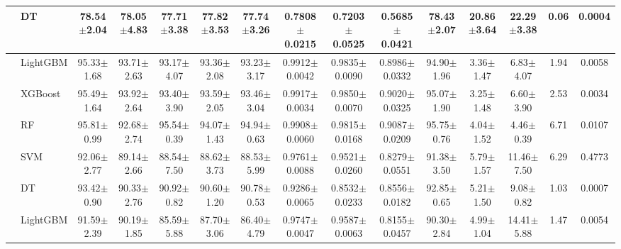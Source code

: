 \begin{tabular}{@{}llccccccccccccc@{}}
 & DT & 78.54{\tiny$\pm$2.04} & 78.05{\tiny$\pm$4.83} & 77.71{\tiny$\pm$3.38} & 77.82{\tiny$\pm$3.53} & 77.74{\tiny$\pm$3.26} & 0.7808{\tiny$\pm$0.0215} & 0.7203{\tiny$\pm$0.0525} & 0.5685{\tiny$\pm$0.0421} & 78.43{\tiny$\pm$2.07} & 20.86{\tiny$\pm$3.64} & 22.29{\tiny$\pm$3.38} & 0.06 & 0.0004\\
\midrule
{} & LightGBM & 95.33{\tiny$\pm$1.68} & 93.71{\tiny$\pm$2.63} & 93.17{\tiny$\pm$4.07} & 93.36{\tiny$\pm$2.08} & 93.23{\tiny$\pm$3.17} & 0.9912{\tiny$\pm$0.0042} & 0.9835{\tiny$\pm$0.0090} & 0.8986{\tiny$\pm$0.0332} & 94.90{\tiny$\pm$1.96} & 3.36{\tiny$\pm$1.47} & 6.83{\tiny$\pm$4.07} & 1.94 & 0.0058\\
 & XGBoost & 95.49{\tiny$\pm$1.64} & 93.92{\tiny$\pm$2.64} & 93.40{\tiny$\pm$3.90} & 93.59{\tiny$\pm$2.05} & 93.46{\tiny$\pm$3.04} & 0.9917{\tiny$\pm$0.0034} & 0.9850{\tiny$\pm$0.0070} & 0.9020{\tiny$\pm$0.0325} & 95.07{\tiny$\pm$1.90} & 3.25{\tiny$\pm$1.48} & 6.60{\tiny$\pm$3.90} & 2.53 & 0.0034\\
 & RF & 95.81{\tiny$\pm$0.99} & 92.68{\tiny$\pm$2.74} & 95.54{\tiny$\pm$0.39} & 94.07{\tiny$\pm$1.43} & 94.94{\tiny$\pm$0.63} & 0.9908{\tiny$\pm$0.0060} & 0.9815{\tiny$\pm$0.0168} & 0.9087{\tiny$\pm$0.0209} & 95.75{\tiny$\pm$0.76} & 4.04{\tiny$\pm$1.52} & 4.46{\tiny$\pm$0.39} & 6.71 & 0.0107\\
 & SVM & 92.06{\tiny$\pm$2.77} & 89.14{\tiny$\pm$2.66} & 88.54{\tiny$\pm$7.50} & 88.62{\tiny$\pm$3.73} & 88.53{\tiny$\pm$5.99} & 0.9761{\tiny$\pm$0.0088} & 0.9521{\tiny$\pm$0.0260} & 0.8279{\tiny$\pm$0.0551} & 91.38{\tiny$\pm$3.50} & 5.79{\tiny$\pm$1.57} & 11.46{\tiny$\pm$7.50} & 6.29 & 0.4773\\
 & DT & 93.42{\tiny$\pm$0.90} & 90.33{\tiny$\pm$2.76} & 90.92{\tiny$\pm$0.82} & 90.60{\tiny$\pm$1.20} & 90.78{\tiny$\pm$0.53} & 0.9286{\tiny$\pm$0.0065} & 0.8532{\tiny$\pm$0.0233} & 0.8556{\tiny$\pm$0.0182} & 92.85{\tiny$\pm$0.65} & 5.21{\tiny$\pm$1.50} & 9.08{\tiny$\pm$0.82} & 1.03 & 0.0007\\
\midrule
{} & LightGBM & 91.59{\tiny$\pm$2.39} & 90.19{\tiny$\pm$1.85} & 85.59{\tiny$\pm$5.88} & 87.70{\tiny$\pm$3.06} & 86.40{\tiny$\pm$4.79} & 0.9747{\tiny$\pm$0.0047} & 0.9587{\tiny$\pm$0.0063} & 0.8155{\tiny$\pm$0.0457} & 90.30{\tiny$\pm$2.84} & 4.99{\tiny$\pm$1.04} & 14.41{\tiny$\pm$5.88} & 1.47 & 0.0054\\

\end{tabular}
